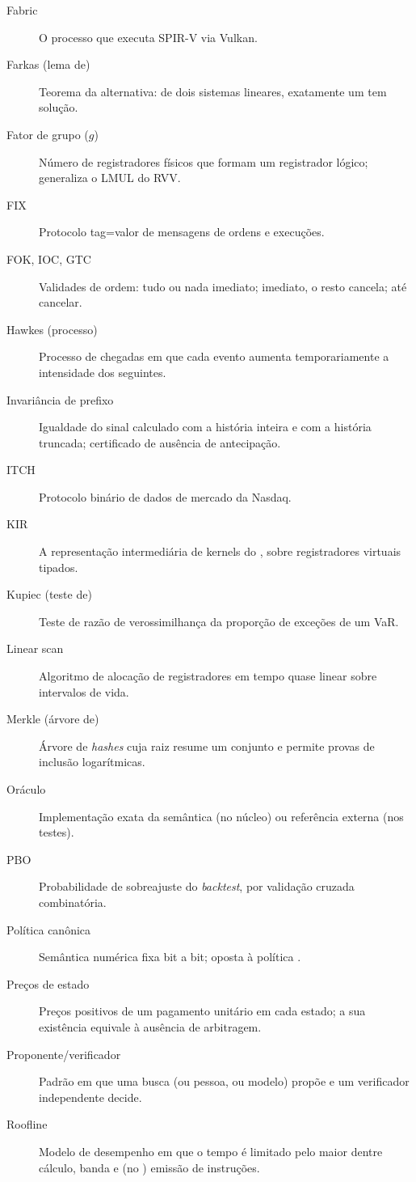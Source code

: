 \begin{description}
  \item[Fabric] O processo que executa SPIR-V via Vulkan.
  \item[Farkas (lema de)] Teorema da alternativa: de dois sistemas lineares, exatamente um tem solução.
  \item[Fator de grupo ($g$)] Número de registradores físicos que formam um registrador lógico; generaliza o LMUL do RVV.
  \item[FIX] Protocolo tag=valor de mensagens de ordens e execuções.
  \item[FOK, IOC, GTC] Validades de ordem: tudo ou nada imediato; imediato, o resto cancela; até cancelar.
  \item[Hawkes (processo)] Processo de chegadas em que cada evento aumenta temporariamente a intensidade dos seguintes.
  \item[Invariância de prefixo] Igualdade do sinal calculado com a história inteira e com a história truncada; certificado de ausência de antecipação.
  \item[ITCH] Protocolo binário de dados de mercado da Nasdaq.
  \item[KIR] A representação intermediária de kernels do \vapor{}, sobre registradores virtuais tipados.
  \item[Kupiec (teste de)] Teste de razão de verossimilhança da proporção de exceções de um VaR.
  \item[Linear scan] Algoritmo de alocação de registradores em tempo quase linear sobre intervalos de vida.
  \item[Merkle (árvore de)] Árvore de \textit{hashes} cuja raiz resume um conjunto e permite provas de inclusão logarítmicas.
  \item[Oráculo] Implementação exata da semântica (no núcleo) ou referência externa (nos testes).
  \item[PBO] Probabilidade de sobreajuste do \textit{backtest}, por validação cruzada combinatória.
  \item[Política canônica] Semântica numérica fixa bit a bit; oposta à política .
  \item[Preços de estado] Preços positivos de um pagamento unitário em cada estado; a sua existência equivale à ausência de arbitragem.
  \item[Proponente/verificador] Padrão em que uma busca (ou pessoa, ou modelo) propõe e um verificador independente decide.
  \item[Roofline] Modelo de desempenho em que o tempo é limitado pelo maior dentre cálculo, banda e (no \vapor{}) emissão de instruções.

\end{description}
